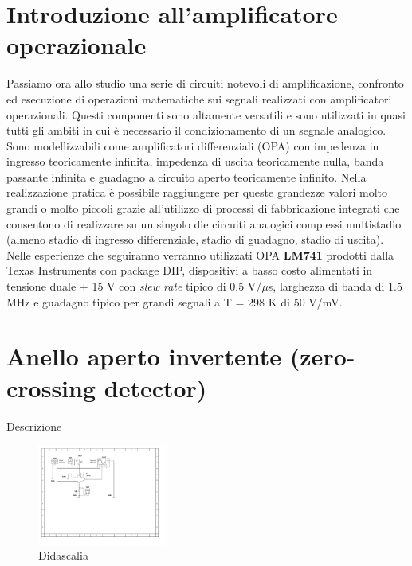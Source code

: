 \documentclass[journal]{IEEEtran}
\begin{document}
\section{\textbf{Introduzione all'amplificatore operazionale}}
Passiamo ora allo studio una serie di circuiti notevoli di amplificazione, confronto ed esecuzione di operazioni matematiche sui segnali realizzati con amplificatori operazionali. Questi componenti sono altamente versatili e sono utilizzati in quasi tutti gli ambiti in cui è necessario il condizionamento di un segnale analogico. Sono modellizzabili come amplificatori differenziali (OPA) con impedenza in ingresso teoricamente infinita, impedenza di uscita teoricamente nulla, banda passante infinita e guadagno a circuito aperto teoricamente infinito. Nella realizzazione pratica è possibile raggiungere per queste grandezze valori molto grandi o molto piccoli grazie all'utilizzo di processi di fabbricazione integrati che consentono di realizzare su un singolo die circuiti analogici complessi multistadio (almeno stadio di ingresso differenziale, stadio di guadagno, stadio di uscita). Nelle esperienze che seguiranno verranno utilizzati OPA \textbf{LM741} prodotti dalla Texas Instruments con package DIP, dispositivi a basso costo alimentati in tensione duale $\pm$ 15 V con \textit{slew rate} tipico di 0.5 V/$\mu$s, larghezza di banda di 1.5 MHz e guadagno tipico per grandi segnali a T = 298 K di 50 V/mV.

\section{\textbf{Anello aperto invertente (zero-crossing detector)}} %
Descrizione

\begin{figure}[H]%
\begin {center}
\includegraphics[width=0.38\textwidth]{sch-simulations/output/OPA-open-loop-inverting.pdf}
\caption{Didascalia}
\label{fig:oscilloscope}
\end {center}
\end{figure}
\end{document}
